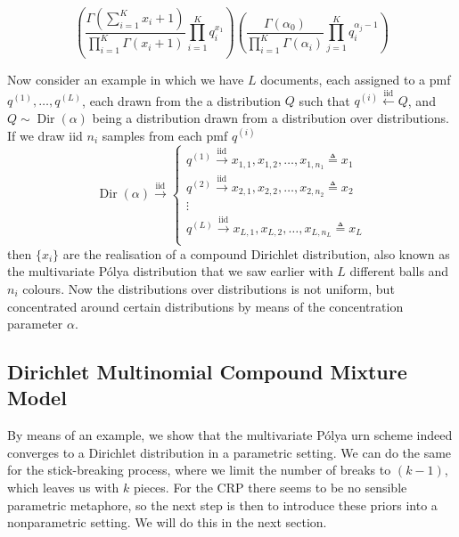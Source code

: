 \begin{equation}
	\left(\frac{\Gamma(\sum_{i=1}^K x_i+1)}{\prod_{i=1}^K \Gamma(x_i+1)}\prod_{i=1}^K q_i^{x_1}\right)\left(\frac{\Gamma(\alpha_0)}{\prod_{i=1}^K \Gamma(\alpha_i)} \prod_{j=1}^K q_i^{\alpha_j-1}\right)
\end{equation}

Now consider an example in which we have $L$ documents, each assigned to a pmf $q^{(1)}, \ldots, q^{(L)}$, each drawn from the a distribution $Q$ such that $q^{(i)} \overset{\text{iid}}{\leftarrow} Q$, and $Q\sim\operatorname{Dir}(\alpha)$ being a distribution drawn from a distribution over distributions. If we draw iid $n_i$ samples from each pmf $q^{(i)}$
\begin{equation}
	\operatorname{Dir}(\alpha) \overset{\text{iid}}{\rightarrow}
    \begin{cases}
    q^{(1)} \overset{\text{iid}}{\rightarrow} x_{1,1}, x_{1,2},\ldots,x_{1,n_1} \triangleq x_1\\
    q^{(2)} \overset{\text{iid}}{\rightarrow} x_{2,1}, x_{2,2},\ldots,x_{2,n_2} \triangleq x_2 \\
    \vdots \\
    q^{(L)} \overset{\text{iid}}{\rightarrow} x_{L,1}, x_{L,2},\ldots,x_{L,n_L} \triangleq x_L \\
  \end{cases}
\end{equation}
then $\{x_i\}$ are the realisation of a compound Dirichlet distribution, also known as the multivariate P\'olya distribution that we saw earlier with $L$ different balls and $n_i$ colours. Now the distributions over distributions is not uniform, but concentrated around certain distributions by means of the concentration parameter $\alpha$.

\subsection{Dirichlet Multinomial Compound Mixture Model}

By means of an example, we show that the multivariate P\'olya urn scheme indeed converges to a Dirichlet distribution in a parametric setting. We can do the same for the stick-breaking process, where we limit the number of breaks to $(k-1)$, which leaves us with $k$ pieces. For the CRP there seems to be no sensible parametric metaphore, so the next step is then to introduce these priors into a nonparametric setting. We will do this in the next section.

